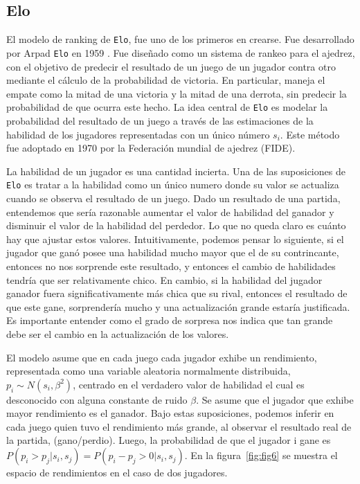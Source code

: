 \documentclass[11pt,twoside,spanish]{report} %
\begin{document}
\subsection{Elo}
El modelo de ranking de \texttt{Elo}, fue uno de los primeros en crearse. Fue desarrollado por Arpad \texttt{Elo} en 1959 \cite{elo1961-uscf}.
Fue dise\~nado como un sistema de rankeo para el ajedrez, con el objetivo de predecir el resultado de un juego de un jugador contra otro mediante el c\'alculo de la probabilidad de victoria.
En particular, maneja el empate como la mitad de una victoria y la mitad de una derrota, sin predecir la probabilidad de que ocurra este hecho.
La idea central de \texttt{Elo} es modelar la probabilidad del resultado de un juego a trav\'es de las estimaciones de la habilidad de los jugadores representadas con un \'unico n\'umero $s_i$.
Este m\'etodo fue adoptado en 1970 por la Federaci\'on mundial de ajedrez (FIDE).


La habilidad de un jugador es una cantidad incierta.
Una de las suposiciones de \texttt{Elo} es tratar a la habilidad como un \'unico numero donde su valor se actualiza cuando se observa el resultado de un juego.
Dado un resultado de una partida, entendemos que ser\'ia razonable aumentar el valor de habilidad del ganador y disminuir el valor de la habilidad del perdedor.
Lo que no queda claro es cu\'anto hay que ajustar estos valores.
Intuitivamente, podemos pensar lo siguiente, si el jugador que gan\'o posee una habilidad mucho mayor que el de su contrincante, entonces no nos sorprende este resultado, y entonces el cambio de habilidades tendr\'ia que ser relativamente chico.
En cambio,  si la habilidad del jugador ganador fuera significativamente m\'as chica que su rival, entonces el resultado de que este gane, sorprender\'ia mucho y una actualizaci\'on grande estar\'ia justificada.
Es importante entender como el grado de sorpresa nos indica que tan grande debe ser el cambio en la actualizaci\'on de los valores.

El modelo asume que en cada juego cada jugador exhibe un rendimiento, representada como una variable aleatoria normalmente distribuida, $p_i\sim N(s_i,\beta^2)$, centrado en el verdadero valor de habilidad el cual es desconocido con alguna constante de ruido $\beta$.
Se asume que el jugador que exhibe mayor rendimiento es el ganador.
Bajo estas suposiciones, podemos inferir en cada juego quien tuvo el rendimiento m\'as grande, al observar el resultado real de la partida, (gano/perdio).
Luego, la probabilidad de que el jugador i gane es $P(p_i>p_j|s_i,s_j)=P(p_i-p_j>0|s_i,s_j)$.
En la figura~\ref{fig:fig6} se muestra el espacio de rendimientos en el caso de dos jugadores.
\end{document}
